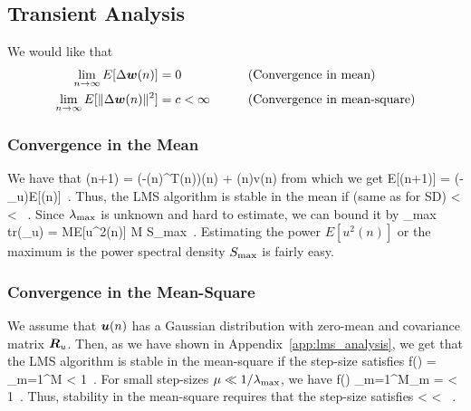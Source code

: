 \subsection{Transient Analysis}
We would like that
\begin{alignat*}{2}
  \lim_{n\to\infty} E[\Delta\boldsymbol{w}(n)] &= 0 &\qquad &\text{(Convergence in mean)}\\
  \lim_{n\to\infty} E[\|\Delta\boldsymbol{w}(n)\|^2] &= c < \infty &\qquad &\text{(Convergence in mean-square)}
\end{alignat*}
\subsubsection{Convergence in the Mean}
We have that
\bmath
  \vect{\Delta}(n+1) = (-\mu{}(n)^T(n))\vect{\Delta}(n) + \mu{}(n)v(n)
\emath
from which we get
\bmath
  E[\vect{\Delta}(n+1)] = (-\mu{}_u)E[\vect{\Delta}(n)]\ .
\emath
Thus, the LMS algorithm is stable in the mean if (same as for SD)
 < \mu < \ .
\emath
Since $\lambda_\textup{max}$ is unknown and hard to estimate, we can bound it by
\bmath
  \lambda_\textup{max} \leq \textup{tr}(_u) = ME[u^2(n)] \leq M S_\textup{max}\ .
\emath
Estimating the power $E[u^2(n)]$ or the maximum is the power spectral density $S_\textup{max}$ is fairly easy.

\subsubsection{Convergence in the Mean-Square}
We assume that $\boldsymbol{u}(n)$ has a Gaussian distribution with zero-mean and covariance matrix $\boldsymbol{R}_u$. Then, as we have shown in Appendix~\ref{app:lms_analysis}, we get that the LMS algorithm is stable in the mean-square if the step-size satisfies
\bmath
  f(\mu) = \sum_{m=1}^M  < 1\ .
\emath
For small step-sizes $\mu \ll 1/\lambda_\textup{max}$, we have
\bmath
  f(\mu) \approx {}\sum_{m=1}^M\lambda_m =  < 1\ .
\emath
Thus, stability in the mean-square requires that the step-size satisfies
 < \mu < \ .
\emath

